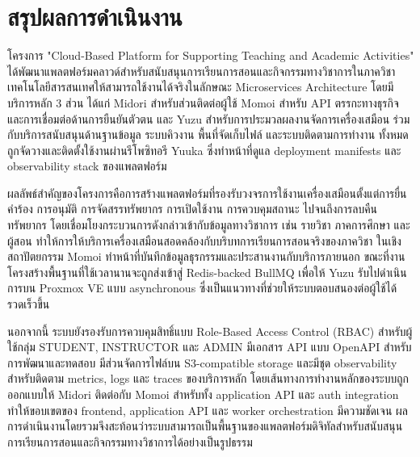 
\section{สรุปผลการดำเนินงาน}
\hspace*{1.3em}
โครงการ "Cloud-Based Platform for Supporting Teaching and Academic Activities" ได้พัฒนาแพลตฟอร์มคลาวด์สำหรับสนับสนุนการเรียนการสอนและกิจกรรมทางวิชาการในภาควิชาเทคโนโลยีสารสนเทศให้สามารถใช้งานได้จริงในลักษณะ Microservices Architecture โดยมีบริการหลัก 3 ส่วน ได้แก่ Midori สำหรับส่วนติดต่อผู้ใช้ Momoi สำหรับ API ตรรกะทางธุรกิจ และการเชื่อมต่อด้านการยืนยันตัวตน และ Yuzu สำหรับการประมวลผลงานจัดการเครื่องเสมือน ร่วมกับบริการสนับสนุนด้านฐานข้อมูล ระบบคิวงาน พื้นที่จัดเก็บไฟล์ และระบบติดตามการทำงาน ทั้งหมดถูกจัดวางและติดตั้งใช้งานผ่านรีโพซิทอรี Yuuka ซึ่งทำหน้าที่ดูแล deployment manifests และ observability stack ของแพลตฟอร์ม

\hspace*{1.3em}
ผลลัพธ์สำคัญของโครงการคือการสร้างแพลตฟอร์มที่รองรับวงจรการใช้งานเครื่องเสมือนตั้งแต่การยื่นคำร้อง การอนุมัติ การจัดสรรทรัพยากร การเปิดใช้งาน การควบคุมสถานะ ไปจนถึงการลบคืนทรัพยากร โดยเชื่อมโยงกระบวนการดังกล่าวเข้ากับข้อมูลทางวิชาการ เช่น รายวิชา ภาคการศึกษา และผู้สอน ทำให้การให้บริการเครื่องเสมือนสอดคล้องกับบริบทการเรียนการสอนจริงของภาควิชา ในเชิงสถาปัตยกรรม Momoi ทำหน้าที่บันทึกข้อมูลธุรกรรมและประสานงานกับบริการภายนอก ขณะที่งานโครงสร้างพื้นฐานที่ใช้เวลานานจะถูกส่งเข้าสู่ Redis-backed BullMQ เพื่อให้ Yuzu รับไปดำเนินการบน Proxmox VE แบบ asynchronous ซึ่งเป็นแนวทางที่ช่วยให้ระบบตอบสนองต่อผู้ใช้ได้รวดเร็วขึ้น

\hspace*{1.3em}
นอกจากนี้ ระบบยังรองรับการควบคุมสิทธิ์แบบ Role-Based Access Control (RBAC) สำหรับผู้ใช้กลุ่ม STUDENT, INSTRUCTOR และ ADMIN มีเอกสาร API แบบ OpenAPI สำหรับการพัฒนาและทดสอบ มีส่วนจัดการไฟล์บน S3-compatible storage และมีชุด observability สำหรับติดตาม metrics, logs และ traces ของบริการหลัก โดยเส้นทางการทำงานหลักของระบบถูกออกแบบให้ Midori ติดต่อกับ Momoi สำหรับทั้ง application API และ auth integration ทำให้ขอบเขตของ frontend, application API และ worker orchestration มีความชัดเจน ผลการดำเนินงานโดยรวมจึงสะท้อนว่าระบบสามารถเป็นพื้นฐานของแพลตฟอร์มดิจิทัลสำหรับสนับสนุนการเรียนการสอนและกิจกรรมทางวิชาการได้อย่างเป็นรูปธรรม

